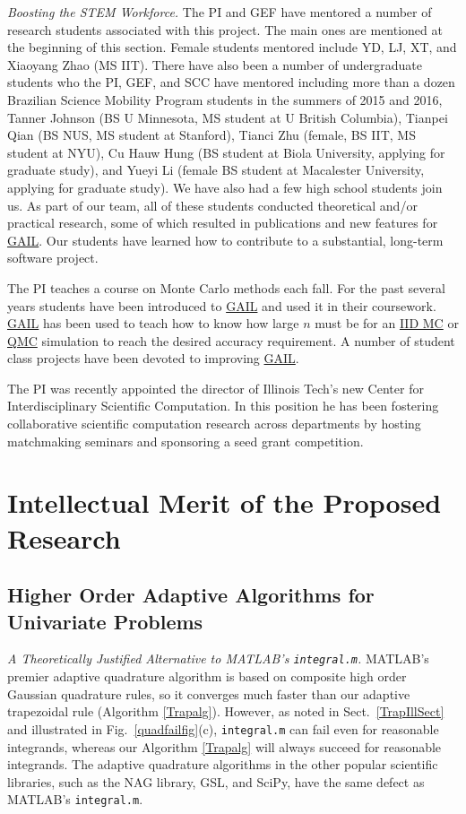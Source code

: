 \documentclass[11pt]{NSFamsart}
\newcommand{\GAIL}{\hyperlink{GAILlink}{GAIL}\xspace}
\newcommand{\QMC}{\hyperlink{QMClink}{QMC}\xspace}
\newcommand{\IIDMC}{\hyperlink{IIDMClink}{IID MC}\xspace}
\begin{document}
\emph{Boosting the STEM Workforce.} The PI and GEF have mentored a number of 
research students associated with this project.  The main ones are mentioned at the beginning of 
this section.  Female students mentored include YD, LJ, XT, and Xiaoyang Zhao (MS IIT).   There 
have also been a 
number of 
undergraduate students who the PI, GEF, and SCC have mentored including more than a dozen 
Brazilian Science Mobility Program students in the summers of 2015 and 2016, Tanner Johnson (BS 
U 
Minnesota, MS student at U British Columbia), Tianpei Qian (BS NUS, MS student at Stanford), 
Tianci Zhu 
(female, BS IIT, MS student at NYU),  Cu Hauw Hung (BS student at Biola University, applying for 
graduate study), and Yueyi Li (female BS student at Macalester University, applying for 
graduate study).  We have also had a few high school students join us. As part of our team, all of 
these students conducted theoretical and/or practical research, some of which resulted in 
publications and new features for \GAIL.  Our students have learned how to contribute to a 
substantial, long-term software project.

The PI teaches a course on Monte Carlo methods each fall.  For the past several years students 
have been introduced to \GAIL and used it in their coursework.  \GAIL has been used to teach how 
to 
know how large $n$ must be for an \IIDMC or \QMC simulation to reach the desired accuracy 
requirement.  A number of student class projects have been devoted to improving \GAIL.

The PI was recently appointed the director of Illinois Tech's new Center for Interdisciplinary 
Scientific Computation.  In this position he has been fostering collaborative scientific computation 
research across departments by hosting matchmaking seminars and sponsoring a seed grant 
competition.


\section{Intellectual Merit of the Proposed Research} \label{secProposed}


\subsection{Higher Order Adaptive Algorithms for Univariate Problems}\label{SectUniProb}

\emph{A Theoretically Justified Alternative to MATLAB's 
\textup{\texttt{integral.m}}.} 
MATLAB's premier adaptive quadrature algorithm is based on composite high order Gaussian 
quadrature rules, so it converges much faster than our adaptive trapezoidal rule (Algorithm 
\ref{Trapalg}). However, as noted in Sect.\ \ref{TrapIllSect} and illustrated in Fig.\ 
\ref{quadfailfig}(c), 
\texttt{integral.m} can fail even for reasonable integrands, whereas our Algorithm 
\ref{Trapalg} will always succeed for reasonable integrands. The adaptive quadrature algorithms in 
the other popular scientific libraries, 
such as the NAG library, GSL, and SciPy, have the same defect as MATLAB's \texttt{integral.m}.  
\end{document}
